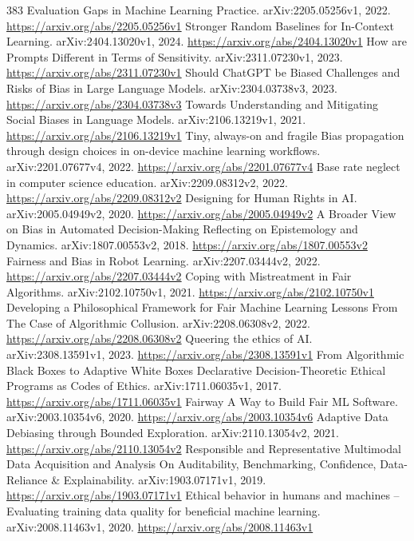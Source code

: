 \documentclass[11pt]{article}
\begin{document}
\begin{thebibliography}{383}
 Evaluation Gaps in Machine Learning Practice. arXiv:2205.05256v1, 2022. \url{https://arxiv.org/abs/2205.05256v1}
 Stronger Random Baselines for In-Context Learning. arXiv:2404.13020v1, 2024. \url{https://arxiv.org/abs/2404.13020v1}
 How are Prompts Different in Terms of Sensitivity. arXiv:2311.07230v1, 2023. \url{https://arxiv.org/abs/2311.07230v1}
 Should ChatGPT be Biased Challenges and Risks of Bias in Large Language Models. arXiv:2304.03738v3, 2023. \url{https://arxiv.org/abs/2304.03738v3}
 Towards Understanding and Mitigating Social Biases in Language Models. arXiv:2106.13219v1, 2021. \url{https://arxiv.org/abs/2106.13219v1}
 Tiny, always-on and fragile Bias propagation through design choices in on-device machine learning workflows. arXiv:2201.07677v4, 2022. \url{https://arxiv.org/abs/2201.07677v4}
 Base rate neglect in computer science education. arXiv:2209.08312v2, 2022. \url{https://arxiv.org/abs/2209.08312v2}
 Designing for Human Rights in AI. arXiv:2005.04949v2, 2020. \url{https://arxiv.org/abs/2005.04949v2}
 A Broader View on Bias in Automated Decision-Making Reflecting on Epistemology and Dynamics. arXiv:1807.00553v2, 2018. \url{https://arxiv.org/abs/1807.00553v2}
 Fairness and Bias in Robot Learning. arXiv:2207.03444v2, 2022. \url{https://arxiv.org/abs/2207.03444v2}
 Coping with Mistreatment in Fair Algorithms. arXiv:2102.10750v1, 2021. \url{https://arxiv.org/abs/2102.10750v1}
 Developing a Philosophical Framework for Fair Machine Learning Lessons From The Case of Algorithmic Collusion. arXiv:2208.06308v2, 2022. \url{https://arxiv.org/abs/2208.06308v2}
 Queering the ethics of AI. arXiv:2308.13591v1, 2023. \url{https://arxiv.org/abs/2308.13591v1}
 From Algorithmic Black Boxes to Adaptive White Boxes Declarative Decision-Theoretic Ethical Programs as Codes of Ethics. arXiv:1711.06035v1, 2017. \url{https://arxiv.org/abs/1711.06035v1}
 Fairway A Way to Build Fair ML Software. arXiv:2003.10354v6, 2020. \url{https://arxiv.org/abs/2003.10354v6}
 Adaptive Data Debiasing through Bounded Exploration. arXiv:2110.13054v2, 2021. \url{https://arxiv.org/abs/2110.13054v2}
 Responsible and Representative Multimodal Data Acquisition and Analysis On Auditability, Benchmarking, Confidence, Data-Reliance \& Explainability. arXiv:1903.07171v1, 2019. \url{https://arxiv.org/abs/1903.07171v1}
 Ethical behavior in humans and machines -- Evaluating training data quality for beneficial machine learning. arXiv:2008.11463v1, 2020. \url{https://arxiv.org/abs/2008.11463v1}

\end{thebibliography}
\end{document}
